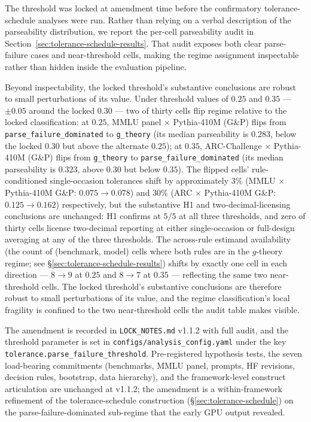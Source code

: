 \documentclass[11pt]{article}
\begin{document}
The threshold was locked at amendment time before the confirmatory
tolerance-schedule analyses were run. Rather than relying on a
verbal description of the parseability distribution, we report the
per-cell parseability audit in Section~\ref{sec:tolerance-schedule-results}.
That audit exposes both clear parse-failure cases and near-threshold
cells, making the regime assignment inspectable rather than hidden
inside the evaluation pipeline.

Beyond inspectability, the locked threshold's substantive conclusions
are robust to small perturbations of its value. Under threshold values
of $0.25$ and $0.35$ --- $\pm 0.05$ around the locked $0.30$ --- two of
thirty cells flip regime relative to the locked classification: at
$0.25$, MMLU panel × Pythia-410M (G\&P) flips from
\texttt{parse\_failure\_dominated} to \texttt{g\_theory} (its median
parseability is $0.283$, below the locked $0.30$ but above the
alternate $0.25$); at $0.35$, ARC-Challenge × Pythia-410M (G\&P) flips
from \texttt{g\_theory} to \texttt{parse\_failure\_dominated} (its median
parseability is $0.323$, above $0.30$ but below $0.35$). The flipped
cells' rule-conditioned single-occasion tolerances shift by approximately
$3\%$ (MMLU × Pythia-410M G\&P: $0.075 \to 0.078$) and $30\%$ (ARC × Pythia-410M
G\&P: $0.125 \to 0.162$) respectively, but the substantive H1 and
two-decimal-licensing conclusions are unchanged: H1 confirms at $5/5$ at
all three thresholds, and zero of thirty cells license two-decimal
reporting at either single-occasion or full-design averaging at any of
the three thresholds. The across-rule estimand availability (the count of
(benchmark, model) cells where both rules are in the $g$-theory regime;
see §\ref{sec:tolerance-schedule-results}) shifts by exactly one cell in
each direction --- $8 \to 9$ at $0.25$ and $8 \to 7$ at $0.35$ --- reflecting
the same two near-threshold cells. The locked threshold's substantive
conclusions are therefore robust to small perturbations of its value, and
the regime classification's local fragility is confined to the two
near-threshold cells the audit table makes visible.

The amendment
is recorded in \texttt{LOCK\_NOTES.md} v1.1.2 with full audit, and
the threshold parameter is set in \texttt{configs/analysis\_config.yaml}
under the key \texttt{tolerance.parse\_failure\_threshold}. Pre-registered
hypothesis tests, the seven load-bearing commitments
(benchmarks, MMLU panel, prompts, HF revisions, decision rules,
bootstrap, data hierarchy), and the framework-level construct
articulation are unchanged at v1.1.2; the amendment is a
within-framework refinement of the tolerance-schedule construction
(§\ref{sec:tolerance-schedule}) on the parse-failure-dominated
sub-regime that the early GPU output revealed.
\end{document}
